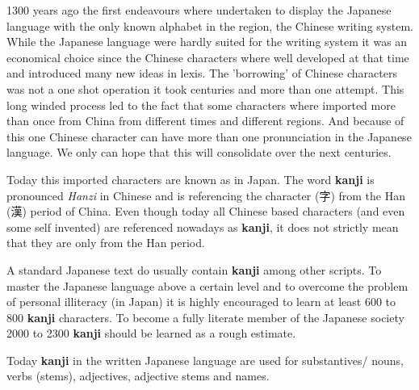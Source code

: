 

1300 years ago the first endeavours where undertaken to display the Japanese
language with the only known alphabet in the region, the Chinese writing
system. While the Japanese language were hardly suited for the writing system
it was an economical choice since the Chinese characters where well developed
at that time and introduced many new ideas in lexis. The 'borrowing' of Chinese
characters was not a one shot operation it took centuries and more than one
attempt. This long winded process led to the fact that some characters where
imported more than once from China from different times and different regions.
And because of this one Chinese character can have more than one pronunciation
in the Japanese language.  We only can hope that this will consolidate over the
next centuries.

Today this imported characters are known as 
in Japan.  The word \textbf{kanji} is pronounced \textit{Hanzi} in Chinese and
is referencing the character ({字}) from the Han ({漢}) period of China. Even
though today all Chinese based characters (and even some self invented) are
referenced nowadays as \textbf{kanji}, it does not strictly mean that they are
only from the Han period.

A standard Japanese text do usually contain \textbf{kanji} among other scripts.
To master the Japanese language above a certain level and to overcome the
problem of personal illiteracy (in Japan) it is highly encouraged to learn at
least 600 to 800 \textbf{kanji} characters. To become a fully literate member
of the Japanese society 2000 to 2300 \textbf{kanji} should be learned as a
rough estimate.

Today \textbf{kanji} in the written Japanese language are used for
substantives/ nouns, verbs (stems), adjectives, adjective stems and names.
